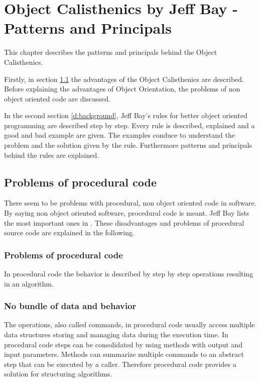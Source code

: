 \chapter{Object Calisthenics by Jeff Bay - Patterns and Principals}
\label{Description}
This chapter describes the patterns and principals behind the Object Calisthenics. 

Firstly, in section \ref{d:problemsprocedural} the advantages of the Object Calisthenics are described. Before explaining the advantages of Object Orientation, the problems of non object oriented code are discussed. 

In the second section \ref{d:background}, Jeff Bay's rules for better object oriented programming are described step by step. Every rule is described, explained and a good and bad example are given. The examples conduce to understand the problem and the solution given by the rule. Furthermore patterns and principals behind the rules are explained. 

\section{Problems of procedural code}
\label{d:problemsprocedural}
There seem to be problems with procedural, non object oriented code in software. By saying non object oriented software, procedural code is meant. Jeff Bay lists the most important ones in \cite[p.70]{oc2008}. These disadvantages and problems of procedural source code are explained in the following. 

\subsection{Problems of procedural code} 
In procedural code the behavior is described by step by step operations resulting in an algorithm. 

\subsection*{No bundle of data and behavior}
The operations, also called commands, in procedural code usually access multiple data structures storing and managing data during the execution time. In procedural code steps can be consolidated by using methods with output and input parameters. Methods can summarize multiple commands to an abstract step that can be executed by a caller. Therefore procedural code provides a solution for structuring algorithms.\\


